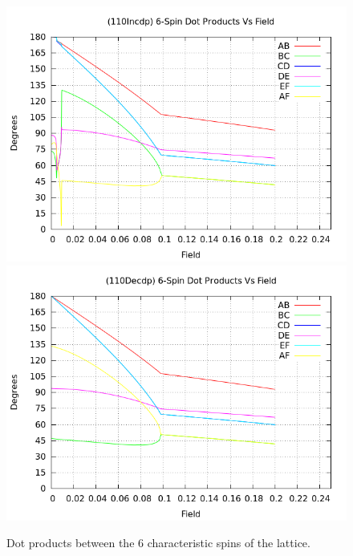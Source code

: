 \documentclass{article}
\begin{document}
\begin{figure}[ht]
\centering
\includegraphics[scale=0.5]{HVariedData/Pictures/110Incdp.png}
\includegraphics[scale=0.5]{HVariedData/Pictures/110Decdp.png}
\caption{Dot products between the 6 characteristic spins of the lattice.}
\end{figure}
\clearpage
\end{document}
